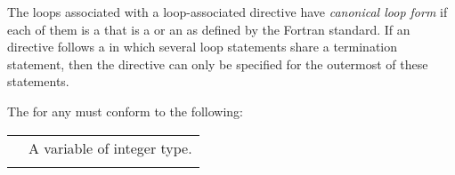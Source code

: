 \begin{fortranspecific}

The loops associated with a loop-associated directive have \emph{canonical loop form} if
each of them is a  that is a  or an
 as defined by the Fortran standard. If an
~ directive follows a  in which several
loop statements share a  termination statement, then the directive
can only be specified for the outermost of these  statements.

The  for any  must conform to the following:

\medskip
\nolinenumbers
\renewcommand{\arraystretch}{1.0}
\tablelasttail{\hline}
\begin{supertabular}{ p{0.8in} p{4.5in}}
    {} & A variable of integer type.\\
    & \\


\end{supertabular}
\end{fortranspecific}
